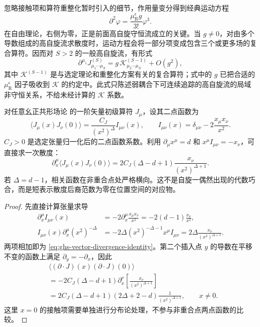 忽略接触项和算符重整化暂时引入的细节，作用量变分得到经典运动方程
\begin{equation}\label{eq:ghs-phi4-eom}
 \partial^2\varphi=\frac{\mu_{\mathrm R}^\epsilon g}{3!}\varphi^3.
\end{equation}
在自由理论，右侧为零，正是前面高自旋守恒流成立的关键。当 $g\ne0$，对由多个导数组成的高自旋流求散度时，运动方程会将一部分项变成包含三个或更多场的复合算符。因而对 $S>2$ 的一般高自旋流，有形式
\begin{equation}\label{eq:ghs-broken-higher-spin-current}
 \partial^{\mu_1}J^{(S)}_{\mu_1\cdots\mu_S}
 =g\,\mathcal K^{(S-1)}_{\mu_2\cdots\mu_S}+O(g^2),
\end{equation}
其中 $\mathcal K^{(S-1)}$ 是与选定理论和重整化方案有关的复合算符；式中的 $g$ 已把合适的 $\mu_{\mathrm R}^\epsilon$ 因子吸收到 $\mathcal K$ 的约定中。此式只陈述弱耦合下可连续追踪的高自旋流的局域非守恒关系，不给未经计算的 $\mathcal K$ 系数。


对任意幺正共形场论 的一阶矢量初级算符 $J_\mu$，设其二点函数为
\begin{equation}\label{eq:ghs-vector-two-point}
 \langle J_\mu(x)J_\nu(0)\rangle
 =\frac{C_J}{(x^2)^\Delta}
 I_{\mu\nu}(x),\qquad
 I_{\mu\nu}(x)=\delta_{\mu\nu}-2\frac{x_\mu x_\nu}{x^2}.
\end{equation}
$C_J>0$ 是选定张量归一化后的二点函数系数。利用 $\partial_\mu x^\mu=d$ 和 $x^\mu I_{\mu\nu}=-x_\nu$，可直接求一次散度：
\begin{equation}\label{eq:ghs-vector-divergence-identity}
 \partial_x^\mu\langle J_\mu(x)J_\nu(0)\rangle
 =2C_J(\Delta-d+1)\frac{x_\nu}{(x^2)^{\Delta+1}}.
\end{equation}
若 $\Delta=d-1$，相关函数在非重合点处严格横向。这不是自旋一偶然出现的代数巧合，而是短表示散度后裔范数为零在位置空间的对应物。



\begin{proof}
先直接计算张量求导
\begin{align*}
\partial_x^\mu I_{\mu\nu}(x)
&=-2\partial_x^\mu\frac{x_\mu x_\nu}{x^2}
=-2(d-1)\frac{x_\nu}{x^2},\\
I_{\mu\nu}(x)\partial_x^\mu(x^2)^{-\Delta}
&=-2\Delta(x^2)^{-\Delta-1}x^\mu I_{\mu\nu}
=2\Delta\frac{x_\nu}{(x^2)^{\Delta+1}}.
\end{align*}
两项相加即为 \cref{eq:ghs-vector-divergence-identity}。第二个插入点 $y$ 的导数在平移不变的函数上满足 $\partial_y=-\partial_x$，因此
\begin{align*}
&\langle(\partial\cdot J)(x)(\partial\cdot J)(0)\rangle\\
&=-2C_J(\Delta-d+1)\partial_x^\nu
\left[\frac{x_\nu}{(x^2)^{\Delta+1}}\right]\\
&=2C_J(\Delta-d+1)(2\Delta+2-d)
\frac1{(x^2)^{\Delta+1}},\qquad x\ne0.
\end{align*}
这里 $x=0$ 的接触项需要单独进行分布论处理，不参与非重合点两点函数的比较。
\end{proof}

